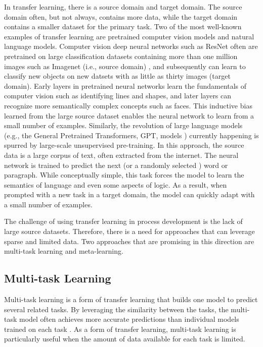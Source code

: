 In transfer learning, there is a source domain and target domain. The source domain often, but not always, contains more data, while the target domain contains a smaller dataset for the primary task. Two of the most well-known examples of transfer learning are pretrained computer vision models and natural language models. Computer vision deep neural networks such as ResNet \cite{He2016} often are pretrained on large classification datasets containing more than one million images such as Imagenet (i.e., source domain) \cite{Russakovsky2015}, and subsequently can learn to classify new objects on new datsets with as little as thirty images (target domain). Early layers in pretrained neural networks learn the fundamentals of computer vision such as identifying lines and shapes, and later layers can recognize more semantically complex concepts such as faces. This inductive bias learned from the large source dataset enables the neural network to learn from a small number of examples.  Similarly, the revolution of large language models (e.g., the General Pretrained Transformers, GPT, models \cite{Radford2018, Brown2020}) currently happening is spurred by large-scale unsupervised pre-training. In this approach, the source data is a large corpus of text, often extracted from the internet. The neural network is trained to predict the next (or a randomly selected \cite{Delvin2019}) word or paragraph. While conceptually simple, this task forces the model to learn the semantics of language and even some aspects of logic. As a result, when prompted with a new task in a target domain, the model can quickly adapt with a small number of examples.

The challenge of using transfer learning in process development is the lack of large source datasets. Therefore, there is a need for approaches that can leverage sparse and limited data. Two approaches that are promising in this direction are multi-task learning and meta-learning.

\subsection{Multi-task Learning}

Multi-task learning is a form of transfer learning that builds one model to predict several related tasks. By leveraging the similarity between the tasks, the multi-task model often achieves more accurate predictions than individual models trained on each task \cite{Simes2018}. As a form of transfer learning, multi-task learning is particularly useful when the amount of data available for each task is limited.

